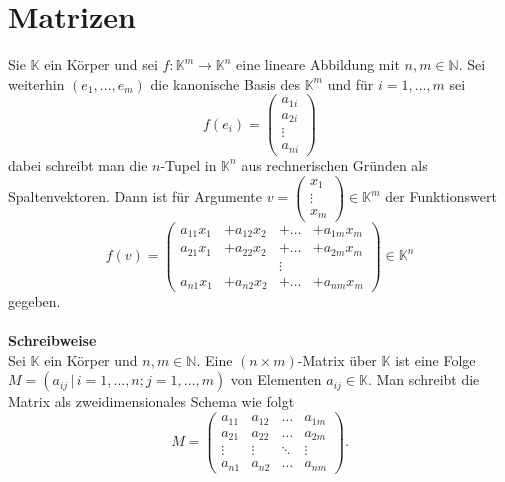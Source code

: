 \documentclass[a4paper,12pt]{article}
\begin{document}
\section{Matrizen}   
Sie $\mathbb{K}$ ein Körper und sei $f:\mathbb{K}^{m}\rightarrow \mathbb{K}^{n}$ eine lineare Abbildung mit $n,m \in \mathbb{N}$. Sei weiterhin $\left(e_1,\hdots ,e_m\right)$ die kanonische Basis des $\mathbb{K}^{m}$ und für $i=1,\hdots ,m$ sei
\[ 
        f\left(e_i\right)=\left(\begin{matrix}
                a_{1i}\\a_{2i}\\\vdots\\a_{n i}
        \end{matrix}\right)
\] 
dabei schreibt man die $n$-Tupel in $\mathbb{K}^{n}$ aus rechnerischen Gründen als Spaltenvektoren. Dann ist für Argumente $v=\left(\begin{matrix}
        x_1\\\vdots\\x_m
\end{matrix}\right) \in \mathbb{K}^{m}$ der Funktionswert
\[ 
        f\left(v\right)=\left(\begin{matrix}
                        a_{11}x_1&+a_{12}x_2&+\hdots &+a_{1m}x_m\\
                        a_{21}x_1&+a_{22}x_2&+\hdots &+a_{2m}x_m\\
                                 &&\vdots&\\
                        a_{n1}x_1&+a_{n2}x_2&+\hdots &+a_{nm}x_m
        \end{matrix}\right) \in \mathbb{K}^{n}
\] 
gegeben.
\\\hfill\\\textbf{Schreibweise}\\ 
Sei $\mathbb{K}$ ein Körper und $n,m \in \mathbb{N}$. Eine $\left(n\times m\right)$-Matrix über $\mathbb{K}$ ist eine Folge $M=\left(a_{ij}\,|\, i=1,\hdots ,n;j=1,\hdots ,m\right)$ von Elementen $a_{ij} \in \mathbb{K}$. Man schreibt die Matrix als zweidimensionales Schema wie folgt
\[ 
        M=\left(\begin{matrix}
                        a_{11}&a_{12}&\hdots &a_{1m}\\
                        a_{21}&a_{22}&\hdots &a_{2m}\\
                        \vdots&\vdots&\ddots &\vdots\\
                        a_{n1}&a_{n2}&\hdots &a_{nm}
        \end{matrix}\right)
.\] 
\end{document}

